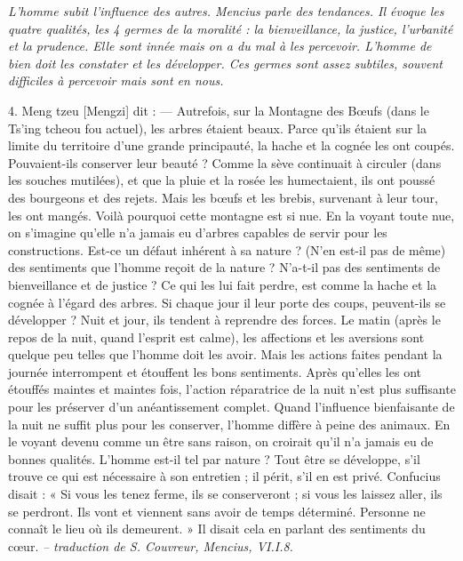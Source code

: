 \textit{L'homme subit l'influence des autres.
Mencius parle des tendances. Il évoque les quatre qualités, les 4 germes de la moralité : la bienveillance, la justice, l'urbanité et la prudence. Elle sont innée mais on a du mal à les percevoir. L'homme de bien doit les constater et les développer. Ces germes sont assez subtiles, souvent difficiles à percevoir mais sont en nous. 
}

\begin{singlequote}
    4.	Meng tzeu [Mengzi] dit :
—	Autrefois, sur la Montagne des Bœufs (dans le Ts’ing tcheou fou actuel), les arbres étaient beaux. Parce qu’ils étaient sur la limite du territoire d’une grande principauté, la hache et la cognée les ont coupés. Pouvaient-ils conserver leur beauté ?  Comme la sève continuait à circuler (dans les souches mutilées), et que la pluie et la rosée les humectaient, ils ont poussé des bourgeons et des rejets. Mais les bœufs et les brebis, survenant à leur tour, les ont mangés. Voilà pourquoi cette montagne est si nue. En la voyant toute nue, on s’imagine qu’elle n’a jamais eu d’arbres capables de servir pour les constructions. Est-ce un défaut inhérent à sa nature ?
(N’en est-il pas de même) des sentiments que l’homme reçoit de la nature ? N’a-t-il pas des sentiments de bienveillance et de justice ? Ce qui les lui fait perdre, est comme la hache et la cognée à l’égard des arbres. Si chaque jour il leur porte des coups, peuvent-ils se développer ? Nuit et jour, ils tendent à reprendre des forces. Le matin (après le repos de la nuit, quand l’esprit est calme), les affections et les aversions sont quelque peu telles que l’homme doit les avoir. Mais les actions faites pendant la journée interrompent et étouffent les bons sentiments. Après qu’elles les ont étouffés maintes et maintes fois, l’action réparatrice de la nuit n’est plus suffisante pour les préserver d’un anéantissement complet. Quand l’influence bienfaisante de la nuit ne suffit plus pour les conserver, l’homme diffère à peine des animaux. En le voyant devenu comme un être sans raison, on croirait qu’il n’a jamais eu de bonnes qualités. L’homme est-il tel par nature ? Tout être se développe, s’il trouve ce qui est nécessaire à son entretien ; il périt, s’il en est privé. Confucius disait : « Si vous les tenez ferme, ils se conserveront ; si vous les laissez aller, ils se perdront. Ils vont et viennent sans avoir de temps déterminé. Personne ne connaît le lieu où ils demeurent. » Il disait cela en parlant des sentiments du cœur. 
 \textit{\small -- traduction de S. Couvreur, Mencius, VI.I.8.}

\end{singlequote}

